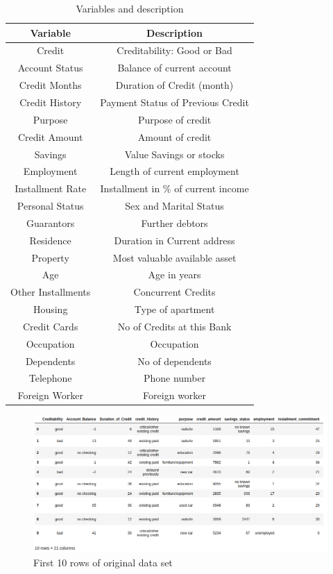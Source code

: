 \documentclass[sigconf]{acmart}
\begin{document}
\begin{table}
  \caption{Variables and description
  \cite{psu-site}}
  \label{tab:table1}
  \begin{tabular}{cc}
    \toprule
     Variable& Description\\
    \midrule
    Credit& Creditability: Good or Bad\\
    Account Status& Balance of current account\\
    Credit Months& Duration of Credit (month)\\
    Credit History& Payment Status of Previous Credit\\
    Purpose& Purpose of credit\\
    Credit Amount& Amount of credit\\
    Savings& Value Savings or stocks\\
    Employment& Length of current employment\\
    Installment Rate& Installment in \% of current income\\
    Personal Status& Sex and Marital Status\\
    Guarantors& Further debtors\\
    Residence& Duration in Current address\\
    Property& Most valuable available asset\\
    Age& Age in years\\
    Other Installments& Concurrent Credits\\
    Housing& Type of apartment\\
    Credit Cards& No of Credits at this Bank\\
    Occupation& Occupation\\
    Dependents& No of dependents\\
    Telephone& Phone number\\
    Foreign Worker& Foreign worker\\
    \bottomrule
  \end{tabular}
\end{table}


\begin{figure}[htb]
  \centering
  \includegraphics[width=1.0\columnwidth]{project/images/Figure2.png}
  \caption{First 10 rows of original data set
  \cite{github}}
  \label{fig:Figure2} 
\end{figure}
\end{document}
